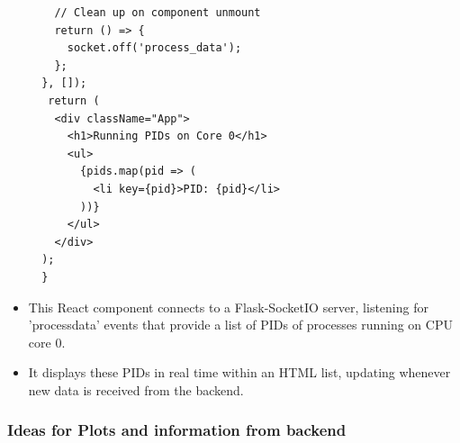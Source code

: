\documentclass[12pt]{article}
\begin{document}
\begin{itemize}
\begin{verbatim}
    // Clean up on component unmount
    return () => {
      socket.off('process_data');
    };
  }, []);
   return (
    <div className="App">
      <h1>Running PIDs on Core 0</h1>
      <ul>
        {pids.map(pid => (
          <li key={pid}>PID: {pid}</li>
        ))}
      </ul>
    </div>
  );
  }
  \end{verbatim}
    \item This React component connects to a Flask-SocketIO server, listening for 'processdata' events that provide a list of PIDs of processes running on CPU core 0. 
    \item It displays these PIDs in real time within an HTML list, updating whenever new data is received from the backend.
\end{itemize}
\subsubsection{Ideas for Plots and information from backend}
\end{document}
